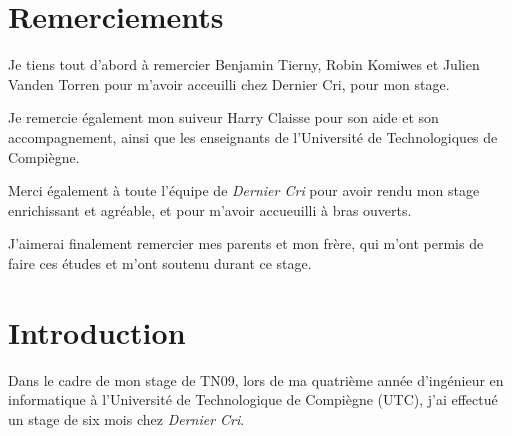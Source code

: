 \newpage

\section{Remerciements}\label{remerciements}

\bigskip

Je tiens tout d'abord à remercier Benjamin Tierny, Robin Komiwes et
Julien Vanden Torren pour m'avoir acceuilli chez Dernier Cri, pour mon
stage.

\bigskip

Je remercie également mon suiveur Harry Claisse pour son aide et son
accompagnement, ainsi que les enseignants de l'Université de
Technologiques de Compiègne.

\bigskip

Merci également à toute l'équipe de \emph{Dernier Cri} pour avoir rendu
mon stage enrichissant et agréable, et pour m'avoir accueuilli à bras
ouverts.

\bigskip

J'aimerai finalement remercier mes parents et mon frère, qui m'ont
permis de faire ces études et m'ont soutenu durant ce stage.

\newpage

\section{Introduction}\label{introduction}

\bigskip

Dans le cadre de mon stage de TN09, lors de ma quatrième année
d'ingénieur en informatique à l'Université de Technologique de Compiègne
(UTC), j'ai effectué un stage de six mois chez \emph{Dernier Cri}.

\bigskip

